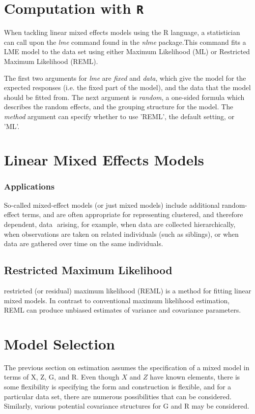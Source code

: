 \documentclass[12pt, a4paper]{report}
\theoremstyle{plain}
\theoremstyle{definition}
\theoremstyle{remark}
\begin{document}
\section{Computation with \texttt{R}} When tackling linear mixed effects models
using the R language, a statistician can call upon the \emph{lme}
command found in the \emph{nlme} package.This command fits a LME
model to the data set using either Maximum Likelihood (ML) or
Restricted Maximum Likelihood (REML).

The first two arguments for \emph{lme} are \emph{fixed} and
\emph{data}, which give the model for the expected responses (i.e.
the fixed part of the model), and the data that the model should
be fitted from. The next argument is  \emph{random}, a one-sided
formula which describes the random effects, and the grouping
structure for the model. The  \emph{method} argument can specify
whether to use 'REML', the default setting, or 'ML'.




\section{Linear Mixed Effects Models}
\subsubsection{Applications}
So-called mixed-effect models (or just mixed models) include
additional random-effect terms, and are often appropriate for
representing clustered, and therefore dependent, data  arising,
for example, when data are collected hierarchically, when
observations are taken on related individuals (such as siblings),
or when data are gathered over time on the same individuals.

\subsection{Restricted Maximum Likelihood}
restricted (or residual) maximum likelihood (REML) is a method for
fitting linear mixed models. In contrast to conventional maximum
likelihood estimation, REML can produce unbiased estimates of
variance and covariance parameters.




\section{Model Selection} The previous section on estimation assumes
the specification of a mixed model in terms of X, Z, G, and R.
Even though $X$ and $Z$ have known elements, there is some
flexibility is specifying the form and construction is flexible,
and for a particular data set, there are numerous possibilities
that can be considered. Similarly, various potential covariance
structures for G and R may be considered.
\end{document}
